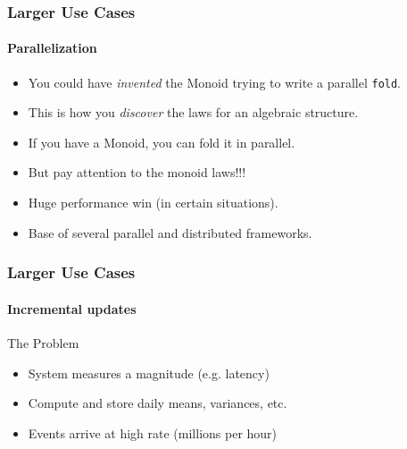 \documentclass{beamer}
\begin{document}
\begin{frame}[fragile]
  \frametitle{Larger Use Cases}
  \framesubtitle{Parallelization}
  \begin{itemize}
    \item You could have \emph{invented} the Monoid trying to write a parallel \texttt{fold}.
    \item This is how you \emph{discover} the laws for an algebraic structure.
    \item If you have a Monoid, you can \alert{fold it in parallel.}
    \item But pay attention to the \alert{monoid laws!!!}
    \item Huge performance win (in certain situations).
    \item Base of several parallel and distributed frameworks.
  \end{itemize}

\end{frame}


\begin{frame}
  \frametitle{Larger Use Cases}
  \framesubtitle{Incremental updates}
  \begin{block}{The Problem}
    \begin{itemize}
      \item System measures a magnitude (e.g. latency)
      \item Compute and store daily means, variances, etc.
      \item Events arrive at high rate (millions per hour)
    \end{itemize}
  \end{block}


\end{frame}
\end{document}
